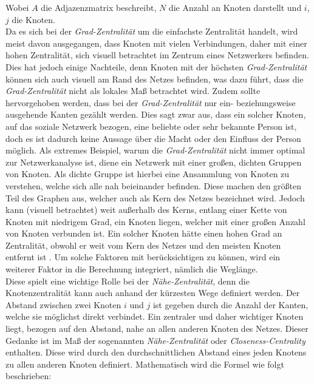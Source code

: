 Wobei $A$ die Adjazenzmatrix beschreibt, $N$ die Anzahl an Knoten darstellt und $i$, $j$ die Knoten. \\
Da es sich bei der \textit{Grad-Zentralität} um die einfachste Zentralität handelt, wird meist davon ausgegangen, dass Knoten mit vielen Verbindungen, daher mit einer hohen Zentralität, sich visuell betrachtet im Zentrum eines Netzwerkers befinden. Dies hat jedoch einige Nachteile, denn Knoten mit der höchsten \textit{Grad-Zentralität} können sich auch visuell am Rand des Netzes befinden, was dazu führt, dass die \textit{Grad-Zentralität} nicht als lokales Maß betrachtet wird. Zudem sollte hervorgehoben werden, dass bei der \textit{Grad-Zentralität} nur ein- beziehungsweise ausgehende Kanten gezählt werden. Dies sagt zwar aus, dass ein solcher Knoten, auf das soziale Netzwerk bezogen, eine beliebte oder sehr bekannte Person ist, doch es ist dadurch keine Aussage über die Macht oder den Einfluss der Person möglich. Als extremes Beispiel, warum die \textit{Grad-Zentralität} nicht immer optimal zur Netzwerkanalyse ist, diene ein Netzwerk mit einer großen, dichten Gruppen von Knoten. Als dichte Gruppe ist hierbei eine Ansammlung von Knoten zu verstehen, welche sich alle nah beieinander befinden. Diese machen den größten Teil des Graphen aus, welcher auch als Kern des Netzes bezeichnet wird. Jedoch kann (visuell betrachtet) weit außerhalb des Kerns, entlang einer Kette von Knoten mit niedrigem Grad, ein Knoten liegen, welcher mit einer großen Anzahl von Knoten verbunden ist. Ein solcher Knoten hätte einen hohen Grad an Zentralität, obwohl er weit vom Kern des Netzes und den meisten Knoten entfernt ist \cite{SpringerElbert}. 
Um solche Faktoren mit berücksichtigen zu können, wird ein weiterer Faktor in die Berechnung integriert, nämlich die Weglänge. \\

Diese spielt eine wichtige Rolle bei der \textit{Nähe-Zentralität}, 
denn die Knotenzentralität kann auch anhand der kürzesten Wege definiert werden. Der Abstand zwischen zwei Knoten $i$ und $j$ ist gegeben durch die Anzahl der Kanten, welche sie möglichst direkt verbindet. Ein zentraler und daher wichtiger Knoten liegt, bezogen auf den Abstand, nahe an allen anderen Knoten des Netzes. Dieser Gedanke ist im Maß der sogenannten \textit{Nähe-Zentralität} oder \textit{Closeness-Centrality} enthalten. Diese wird durch den durchschnittlichen Abstand eines jeden Knotens zu allen anderen Knoten definiert. Mathematisch wird die Formel wie folgt beschrieben: 

